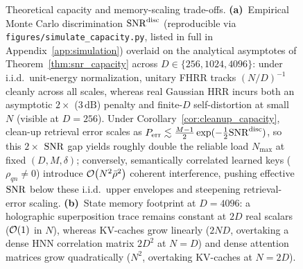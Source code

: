 \begin{figure}[tbp]
    \centering
    
    \caption{Theoretical capacity and memory-scaling trade-offs. \textbf{(a)}~Empirical Monte Carlo discrimination $\mathrm{SNR}^{\mathrm{disc}}$ (reproducible via \texttt{figures/simulate\_capacity.py}, listed in full in Appendix~\ref{app:simulation}) overlaid on the analytical asymptotes of Theorem~\ref{thm:snr_capacity} across $D \in \{256, 1024, 4096\}$: under i.i.d.\ unit-energy normalization, unitary FHRR tracks $(N/D)^{-1}$ cleanly across all scales, whereas real Gaussian HRR incurs both an asymptotic $2\times$ ($3\,\mathrm{dB}$) penalty and finite-$D$ self-distortion at small $N$ (visible at $D=256$). Under Corollary~\ref{cor:cleanup_capacity}, clean-up retrieval error scales as $P_{\mathrm{err}} \lesssim \frac{M-1}{2}\exp(-\frac{1}{2}\mathrm{SNR}^{\mathrm{disc}})$, so this $2\times$ $\mathrm{SNR}$ gap yields roughly double the reliable load $N_{\max}$ at fixed $(D,M,\delta)$; conversely, semantically correlated learned keys ($\rho_{qn} \neq 0$) introduce $\mathcal{O}\!\left(N^2\bar{\rho}^2\right)$ coherent interference, pushing effective $\mathrm{SNR}$ below these i.i.d.\ upper envelopes and steepening retrieval-error scaling. \textbf{(b)}~State memory footprint at $D=4096$: a holographic superposition trace remains constant at $2D$ real scalars ($\mathcal{O}\!\left(1\right)$ in $N$), whereas KV-caches grow linearly ($2ND$, overtaking a dense HNN correlation matrix $2D^2$ at $N=D$) and dense attention matrices grow quadratically ($N^2$, overtaking KV-caches at $N=2D$).}
    \label{fig:capacity}
\end{figure}
